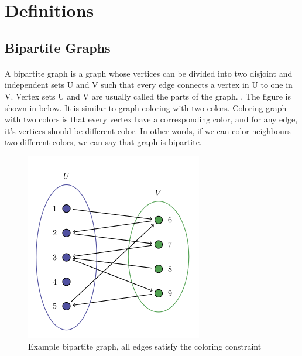 \documentclass[12pt]{article}
\begin{document}
\section{Definitions}
\subsection{Bipartite Graphs}
\paragraph{}
A bipartite graph is a graph whose vertices can be divided into two disjoint and independent sets U and V such that every edge connects a vertex in U to one in V. Vertex sets U and V are usually called the parts of the graph. \cite{1}. The figure is shown in below. It is similar to graph coloring with two colors. Coloring graph with two colors is that every vertex have a corresponding color, and for any edge, it's vertices should be different color. In other words, if we can color neighbours two different colors, we can say that graph is bipartite.



\begin{figure}[h!]
\begin{center}
\includegraphics[width=\linewidth/2]{bipartite.png}
  \end{center}
\caption{ Example bipartite graph, all edges satisfy the coloring constraint }
  \label{fig}
\end{figure}
\end{document}
